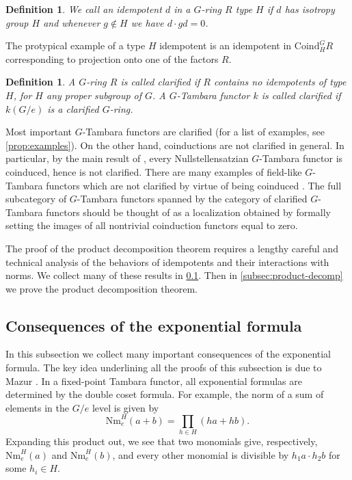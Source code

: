 \documentclass[11pt,dvipsnames]{amsart}
\theoremstyle{BoldRemark}
\newtheorem{definition}[theorem]{Definition}
\begin{document}
\begin{definition}
	We call an idempotent $d$ in a $G$-ring $R$ \emph{type $H$} if $d$ has isotropy group $H$ and whenever $g \notin H$ we have $d \cdot gd = 0$.
\end{definition}

The protypical example of a type $H$ idempotent is an idempotent in $\mathrm{Coind}_H^G R$ corresponding to projection onto one of the factors $R$.

\begin{definition}
	A $G$-ring $R$ is called \emph{clarified} if $R$ contains no idempotents of type $H$, for $H$ any proper subgroup of $G$. A $G$-Tambara functor $k$ is called clarified if $k(G/e)$ is a clarified $G$-ring.
\end{definition}

Most important $G$-Tambara functors are clarified (for a list of examples, see \cref{prop:examples}). On the other hand, coinductions are not clarified in general. In particular, by the main result of \cite{SSW24}, every Nullstellensatzian $G$-Tambara functor is coinduced, hence is not clarified. There are many examples of field-like $G$-Tambara functors which are not clarified by virtue of being coinduced \cite{Wis24}. The full subcategory of $G$-Tambara functors spanned by the category of clarified $G$-Tambara functors should be thought of as a localization obtained by formally setting the images of all nontrivial coinduction functors equal to zero.

The proof of the product decomposition theorem requires a lengthy careful and technical analysis of the behaviors of idempotents and their interactions with norms. We collect many of these results in \cref{subsec:consequences-of-exp-formula}. Then in \cref{subsec:product-decomp} we prove the product decomposition theorem.

\subsection{Consequences of the exponential formula}\label{subsec:consequences-of-exp-formula}

In this subsection we collect many important consequences of the exponential formula. The key idea underlining all the proofs of this subsection is due to Mazur \cite{Maz13}. In a fixed-point Tambara functor, all exponential formulas are determined by the double coset formula. For example, the norm of a sum of elements in the $G/e$ level is given by 
\[ 
    \mathrm{Nm}_e^H(a+b) = \prod_{h \in H} \left( ha+hb \right) .
\] 
Expanding this product out, we see that two monomials give, respectively, $\mathrm{Nm}_e^H(a)$ and $\mathrm{Nm}_e^H(b)$, and every other monomial is divisible by $h_1 a \cdot h_2 b$ for some $h_i \in H$.
\end{document}

